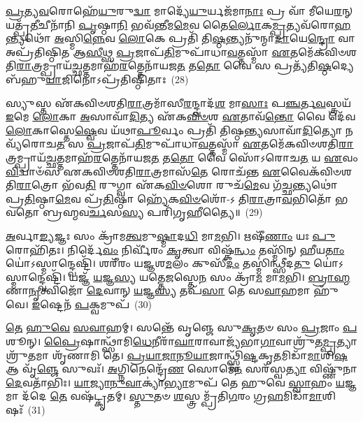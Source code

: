\-\ul{𑌪𑍍𑌰}\-\-\ul{𑌤𑍍𑌯}\-\-\ul{𑌵}\-𑌰𑍋𑌹𑍇᳴\-\ul{𑌯𑍁}\-𑌰𑍁\-\ul{𑌦𑍍𑌵𑌾} 𑌮𑌾𑌦𑍍𑌯𑍇᳴\-\ul{𑌯𑍁}\-𑌰𑍍𑌯𑌜᳴𑌮𑌾\-\ul{𑌨𑌾𑌃} 𑌪𑍍𑌰 𑌵𑌾᳴ 𑌮𑍀𑌯𑍇\-\ul{𑌰}\-𑌨𑍍 𑌯𑌤𑍍𑌪𑍍𑌰᳴\-\ul{𑌤𑍀}\-𑌚𑍀𑌨𑌾᳴𑌨𑌿 \ul{𑌪𑍃}\-𑌷𑍍𑌠𑌾\-\ul{𑌨𑌿} 𑌭𑌵᳴\-\ul{𑌨𑍍𑌤𑍀}\-𑌮\-\ul{𑌮𑍇}\-𑌵 𑌤𑍈\-\ul{𑌰𑍍𑌲𑍋}\-𑌕\-\ul{𑌮𑍍𑌪𑍍𑌰}\-𑌤𑍍𑌯𑌵᳴𑌰𑍋\-\ul{𑌹}\-𑌨𑍍𑌤𑍍𑌯𑌥𑍋᳴ \ul{𑌅}\-𑌸𑍍𑌮𑌿\-\ul{𑌨𑍍𑌨𑍇}\-𑌵 \ul{𑌲𑍋}\-𑌕𑍇 𑌪𑍍𑌰𑌤𑌿᳴ 𑌤𑌿\-\ul{𑌷𑍍𑌠}\-𑌨𑍍𑌤𑍍𑌯𑌨𑍁᳴𑌨𑍍𑌮𑌾\-\ul{𑌦𑌾}\-𑌯𑍇\-\ul{𑌨𑍍𑌦𑍍𑌰𑍋} 𑌵𑌾 𑌅𑌪𑍍𑌰᳴𑌤𑌿𑌷𑍍𑌠𑌿𑌤 𑌆\-\ul{𑌸𑍀}\-𑌥𑍍𑌸 \ul{𑌪𑍍𑌰}\-𑌜𑌾𑌪᳴\-\ul{𑌤𑌿}\-𑌮𑍁𑌪𑌾᳴𑌧𑌾\-\ul{𑌵}\-𑌤𑍍𑌤𑌸𑍍𑌮𑌾᳴ \ul{𑌏}\-𑌤𑌮𑍇᳴𑌕𑌵𑌿𑍞𑌶𑌤𑌿\-\ul{𑌰𑌾}\-𑌤𑍍𑌰𑌮𑍍𑌪𑍍𑌰𑌾𑌯᳴\-\ul{𑌚𑍍𑌛}\-𑌤𑍍𑌤𑌮𑌾𑌹᳴\-\ul{𑌰}\-𑌤𑍍𑌤𑍇𑌨𑌾᳴𑌯𑌜\-\ul{𑌤} 𑌤\-\ul{𑌤𑍋} 𑌵𑍈 𑌸 𑌪𑍍𑌰𑌤𑍍𑌯᳴𑌤𑌿\-\ul{𑌷𑍍𑌠}\-𑌦𑍍𑌯𑍇 𑌬᳴𑌹𑍁\-\ul{𑌯𑌾}\-𑌜𑌿𑌨𑍋\-𑌽𑌪𑍍𑌰᳴𑌤𑌿𑌷𑍍𑌠𑌿𑌤𑌾𑌃~(28)

𑌸𑍍𑌯𑍁𑌸𑍍𑌤 𑌏᳴𑌕𑌵𑌿𑍞𑌶𑌤𑌿\-\ul{𑌰𑌾}\-𑌤𑍍𑌰𑌮𑌾᳴𑌸𑍀\-\ul{𑌰}\-𑌨𑍍𑌦𑍍𑌵𑌾𑌦᳴\-\ul{𑌶} 𑌮𑌾\-\ul{𑌸𑌾𑌃} 𑌪\-\ul{𑌞𑍍𑌚}\-𑌰𑍍𑌤\-\ul{𑌵}\-𑌸𑍍𑌤𑍍𑌰𑌯᳴ \ul{𑌇}\-𑌮𑍇 \ul{𑌲𑍋}\-𑌕𑌾 \ul{𑌅}\-𑌸𑌾𑌵𑌾᳴\-\ul{𑌦𑌿}\-𑌤𑍍𑌯 𑌏᳴𑌕\-\ul{𑌵𑌿}\-\-\ul{𑍞}\-𑌶 \ul{𑌏}\-𑌤𑌾𑌵᳴\-\ul{𑌨𑍍𑌤𑍋} 𑌵𑍈 𑌦𑍇᳴𑌵\-\ul{𑌲𑍋}\-𑌕𑌾𑌸𑍍𑌤𑍇\-\ul{𑌷𑍍𑌵𑍇}\-𑌵 𑌯᳴𑌥𑌾\-\ul{𑌪𑍂}\-𑌰𑍍𑌵𑌂 𑌪𑍍𑌰𑌤𑌿᳴ 𑌤𑌿𑌷𑍍𑌠\-\ul{𑌨𑍍𑌤𑍍𑌯}\-𑌸𑌾𑌵𑌾᳴\-\ul{𑌦𑌿}\-𑌤𑍍𑌯𑍋 𑌨 𑌵𑍍𑌯᳴𑌰𑍋𑌚\-\ul{𑌤} 𑌸 \ul{𑌪𑍍𑌰}\-𑌜𑌾𑌪᳴\-\ul{𑌤𑌿}\-𑌮𑍁𑌪𑌾᳴𑌧𑌾\-\ul{𑌵}\-𑌤𑍍𑌤𑌸𑍍𑌮𑌾᳴ \ul{𑌏}\-𑌤𑌮𑍇᳴𑌕𑌵𑌿𑍞𑌶𑌤𑌿\-\-\ul{𑌰𑌾}\-𑌤𑍍𑌰𑌮𑍍𑌪𑍍𑌰𑌾𑌯᳴\-\ul{𑌚𑍍𑌛}\-𑌤𑍍𑌤𑌮𑌾𑌹᳴\-\ul{𑌰}\-𑌤𑍍𑌤𑍇𑌨𑌾᳴𑌯𑌜\-\ul{𑌤} 𑌤\-\ul{𑌤𑍋} 𑌵𑍈 𑌸𑍋᳴\-𑌽𑌰𑍋𑌚\-\ul{𑌤} 𑌯 \ul{𑌏}\-𑌵𑌂 \ul{𑌵𑌿}\-𑌦𑍍𑌵𑌾𑍞᳴𑌸 𑌏𑌕𑌵𑌿𑍞𑌶𑌤𑌿\-\ul{𑌰𑌾}\-𑌤𑍍𑌰𑌮𑌾𑌸᳴\-\ul{𑌤𑍇} 𑌰𑍋𑌚᳴𑌨𑍍𑌤 \ul{𑌏}\-𑌵𑍈𑌕᳴𑌵𑌿𑍞𑌶𑌤𑌿\-\ul{𑌰𑌾}\-𑌤𑍍𑌰𑍋 𑌭᳴𑌵\-\ul{𑌤𑌿} 𑌰𑍁𑌗𑍍𑌵𑌾 𑌏᳴𑌕\-\ul{𑌵𑌿}\-\-\ul{𑍞}\-𑌶𑍋 𑌰𑍁𑌚᳴\-\ul{𑌮𑍇}\-𑌵 𑌗᳴\-\ul{𑌚𑍍𑌛}\-𑌨𑍍𑌤𑍍𑌯𑌥𑍋॑ 𑌪𑍍𑌰\-\ul{𑌤𑌿}\-𑌷𑍍𑌠𑌾\-\ul{𑌮𑍇}\-𑌵 𑌪𑍍𑌰᳴\-\ul{𑌤𑌿}\-𑌷𑍍𑌠𑌾 𑌹𑍍𑌯𑍇᳴𑌕\-\ul{𑌵𑌿}\-\-\ul{𑍞}\-𑌶𑍋᳴-\-𑌽 𑌤𑌿\-\ul{𑌰𑌾}\-𑌤𑍍𑌰𑌾\-\ul{𑌵}\-𑌭𑌿𑌤𑍋᳴ 𑌭𑌵𑌤𑍋 𑌬𑍍𑌰𑌹𑍍𑌮𑌵\-\ul{𑌰𑍍𑌚}\-𑌸\-\ul{𑌸𑍍𑌯} 𑌪𑌰𑌿᳴𑌗𑍃𑌹𑍀𑌤𑍍𑌯𑍈॥~(29)

{\anuvakamend[{\-\ul{𑌗𑍃}\-\-\ul{𑌹𑍍𑌣}\-\-\ul{𑌨𑍍𑌤𑌿} \ul{𑌦𑌿}\-\-\ul{𑌵𑌾}\-\-\ul{𑌕𑍀}\-𑌰𑍍𑌤𑍍𑌯𑍇᳴\-\ul{𑌨𑍈}\-𑌵𑍋\-\ul{𑌭}\-𑌯\-\ul{𑌤𑍋} 𑌨𑌾𑌪𑍍𑌰᳴𑌤𑌿𑌷𑍍𑌠𑌿\-\ul{𑌤𑌾} 𑌆𑌸᳴\-\ul{𑌤} 𑌏𑌕᳴𑌵𑌿𑍞𑌶𑌤𑌿𑌶𑍍𑌚}]}%

\-\ul{𑌅}\-𑌰𑍍𑌵𑌾\-\ul{𑌙𑍍𑌯}\-𑌜𑍍𑌞𑌃 𑌸𑌂 𑌕𑍍𑌰𑌾᳴𑌮\-\ul{𑌤𑍍𑌵}\-𑌮𑍁\-\ul{𑌷𑍍𑌮𑌾}\-𑌦\-\ul{𑌧𑌿} 𑌮𑌾\-\ul{𑌮}\-𑌭𑌿। 𑌋𑌷𑍀᳴\-\ul{𑌣𑌾𑌂} 𑌯𑌃 \ul{𑌪𑍁}\-𑌰𑍋𑌹𑌿᳴𑌤𑌃। 𑌨𑌿𑌰𑍍𑌦𑍇᳴\-\ul{𑌵𑌂} 𑌨𑌿𑌰𑍍𑌵𑍀᳴𑌰𑌂 \ul{𑌕𑍃}\-𑌤𑍍𑌵𑌾 𑌵𑌿𑌷𑍍𑌕᳴\-\ul{𑌨𑍍𑌧𑌂} 𑌤𑌸𑍍𑌮𑌿᳴𑌨𑍍 𑌹𑍀𑌯\-\ul{𑌤𑌾𑌂} 𑌯𑍋॑\-𑌽𑌸𑍍𑌮𑌾𑌨𑍍𑌦𑍍𑌵𑍇𑌷𑍍𑌟𑌿᳴। 𑌶𑌰𑍀᳴𑌰𑌂 𑌯𑌜𑍍𑌞𑌶\-\ul{𑌮}\-𑌲𑌂 𑌕𑍁𑌸𑍀᳴\-\ul{𑌦𑌂} 𑌤𑌸𑍍𑌮𑌿॑𑌨𑍍𑌥𑍍𑌸𑍀𑌦\-\ul{𑌤𑍁} 𑌯𑍋॑\-𑌽𑌸𑍍𑌮𑌾𑌨𑍍𑌦𑍍𑌵𑍇𑌷𑍍𑌟𑌿᳴। 𑌯𑌜𑍍𑌞᳴ \ul{𑌯}\-𑌜𑍍𑌞\-\ul{𑌸𑍍𑌯} 𑌯𑌤𑍍𑌤𑍇\-\ul{𑌜}\-𑌸𑍍𑌤𑍇\-\ul{𑌨} 𑌸𑌂 𑌕𑍍𑌰𑌾᳴\-\ul{𑌮} 𑌮𑌾\-\ul{𑌮}\-𑌭𑌿। \ul{𑌬𑍍𑌰𑌾}\-\-\ul{𑌹𑍍𑌮}\-𑌣𑌾\-\ul{𑌨𑍃}\-𑌤𑍍𑌵𑌿𑌜𑍋᳴ \ul{𑌦𑍇}\-𑌵𑌾𑌨𑍍 \ul{𑌯}\-𑌜𑍍𑌞\-\ul{𑌸𑍍𑌯} 𑌤𑌪᳴\-\ul{𑌸𑌾} 𑌤𑍇 𑌸\-\ul{𑌵𑌾}\-𑌹𑌮𑌾 𑌹𑍁᳴𑌵𑍇। \ul{𑌇}\-𑌷𑍍𑌟𑍇𑌨᳴ \ul{𑌪}\-𑌕𑍍𑌵𑌮𑍁𑌪᳴~(30)

\-\ul{𑌤𑍇} \ul{𑌹𑍁}\-\-\ul{𑌵𑍇} \ul{𑌸}\-\-\ul{𑌵𑌾}\-𑌹𑌮𑍍। 𑌸𑌨𑍍𑌤𑍇᳴ 𑌵𑍃𑌞𑍍𑌜𑍇 𑌸𑍁\-\ul{𑌕𑍃}\-𑌤𑍞 𑌸𑌂 \ul{𑌪𑍍𑌰}\-𑌜𑌾𑌂 \ul{𑌪}\-𑌶𑍂𑌨𑍍। \ul{𑌪𑍍𑌰𑍈}\-𑌷𑌾𑌨𑍍𑌥𑍍𑌸𑌾᳴𑌮𑌿\-\ul{𑌧𑍇}\-𑌨𑍀𑌰𑌾᳴\-\ul{𑌘𑌾}\-𑌰𑌾𑌵𑌾𑌜𑍍𑌯᳴𑌭𑌾\-\ul{𑌗𑌾}\-𑌵𑌾𑌶𑍍𑌰𑍁᳴𑌤\-\ul{𑌮𑍍𑌪𑍍𑌰}\-𑌤𑍍𑌯𑌾𑌶𑍍𑌰𑍁᳴\-\ul{𑌤}\-𑌮𑌾 𑌶𑍃᳴𑌣𑌾𑌮𑌿 𑌤𑍇। \ul{𑌪𑍍𑌰}\-\-\ul{𑌯𑌾}\-\-\ul{𑌜𑌾}\-\-\ul{𑌨𑍂}\-\-\ul{𑌯𑌾}\-𑌜𑌾𑌨𑍍𑌥𑍍𑌸𑍍𑌵𑌿᳴\-\ul{𑌷𑍍𑌟}\-𑌕𑍃\-\ul{𑌤}\-𑌮𑌿𑌡𑌾᳴\-\ul{𑌮𑌾}\-𑌶𑌿\-\ul{𑌷} 𑌆 𑌵𑍃᳴\-\ul{𑌞𑍍𑌜𑍇} 𑌸𑍁𑌵𑌃᳴। \ul{𑌅}\-𑌗𑍍𑌨𑌿𑌨𑍇𑌨𑍍𑌦𑍍𑌰𑍇᳴\-\ul{𑌣} 𑌸𑍋𑌮𑍇᳴\-\ul{𑌨} 𑌸𑌰᳴𑌸𑍍𑌵\-\ul{𑌤𑍍𑌯𑌾} 𑌵𑌿𑌷𑍍𑌣𑍁᳴𑌨𑌾 \ul{𑌦𑍇}\-𑌵𑌤𑌾᳴𑌭𑌿𑌃। \ul{𑌯𑌾}\-\-\ul{𑌜𑍍𑌯𑌾}\-\-\ul{𑌨𑍁}\-\-\ul{𑌵𑌾}\-𑌕𑍍𑌯𑌾॑\-\ul{𑌭𑍍𑌯𑌾}\-𑌮𑍁𑌪᳴ 𑌤𑍇 𑌹𑍁𑌵𑍇 \ul{𑌸𑍍𑌵𑌾}\-𑌹𑌂 \ul{𑌯}\-𑌜𑍍𑌞𑌮𑌾 𑌦᳴𑌦𑍇 \ul{𑌤𑍇} 𑌵𑌷᳴𑌟𑍍𑌕𑍃𑌤𑌮𑍍। \ul{𑌸𑍍𑌤𑍁}\-𑌤𑍞 \ul{𑌶}\-𑌸𑍍𑌤𑍍𑌰𑌮𑍍𑌪𑍍𑌰᳴𑌤𑌿\-\ul{𑌗}\-𑌰𑌂 𑌗𑍍𑌰\-\ul{𑌹}\-𑌮𑌿𑌡𑌾᳴\-\ul{𑌮𑌾}\-𑌶𑌿𑌷𑌃᳴~(31)

